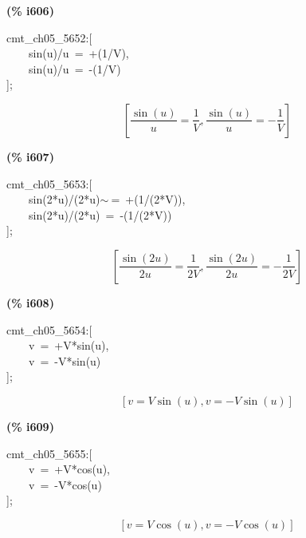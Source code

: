 \documentclass[fleqn]{article}
\begin{document}
\noindent
\begin{minipage}[t]{4.000000em}\color{red}\bfseries
(\% i606)	
\end{minipage}
\begin{minipage}[t]{\textwidth}\color{blue}
cmt\_ch05\_5652:[\\
\ \ \ \ sin(u)/u\ =\ +(1/V),\\
\ \ \ \ sin(u)/u\ =\ -(1/V)\\
];
\end{minipage}
\[\displaystyle \tag{\% o606} 
\left[ \frac{\sin{(u)}}{u}=\frac{1}{V}\operatorname{,}\frac{\sin{(u)}}{u}=-\frac{1}{V}\right] \mbox{}
\]


\noindent
\begin{minipage}[t]{4.000000em}\color{red}\bfseries
(\% i607)	
\end{minipage}
\begin{minipage}[t]{\textwidth}\color{blue}
cmt\_ch05\_5653:[\\
\ \ \ \ sin(2*u)/(2*u)\ensuremath{\sim\ }=\ +(1/(2*V)),\\
\ \ \ \ sin(2*u)/(2*u)\ =\ -(1/(2*V))\\
];
\end{minipage}
\[\displaystyle \tag{\% o607} 
\left[ \frac{\sin{\left( 2 u\right) }}{2 u}=\frac{1}{2 V}\operatorname{,}\frac{\sin{\left( 2 u\right) }}{2 u}=-\frac{1}{2 V}\right] \mbox{}
\]


\noindent
\begin{minipage}[t]{4.000000em}\color{red}\bfseries
(\% i608)	
\end{minipage}
\begin{minipage}[t]{\textwidth}\color{blue}
cmt\_ch05\_5654:[\\
\ \ \ \ v\ =\ +V*sin(u),\\
\ \ \ \ v\ =\ -V*sin(u)\\
];
\end{minipage}
\[\displaystyle \tag{\% o608} 
\left[ v=V \sin{(u)}\operatorname{,}v=-V \sin{(u)}\right] \mbox{}
\]


\noindent
\begin{minipage}[t]{4.000000em}\color{red}\bfseries
(\% i609)	
\end{minipage}
\begin{minipage}[t]{\textwidth}\color{blue}
cmt\_ch05\_5655:[\\
\ \ \ \ v\ =\ +V*cos(u),\\
\ \ \ \ v\ =\ -V*cos(u)\\
];
\end{minipage}
\[\displaystyle \tag{\% o609} 
\left[ v=V \cos{(u)}\operatorname{,}v=-V \cos{(u)}\right] \mbox{}
\]
\end{document}
